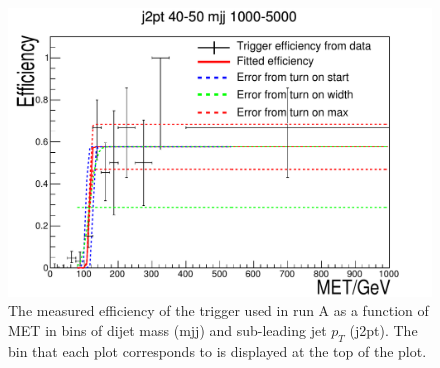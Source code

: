 \begin{figure}[h!]
\begin{center}
    \includegraphics[width=.6\largefigwidth]{plots/parked/trigfitplots/hData_MET_1D_25A.pdf}
    \caption{The measured efficiency of the trigger used in run A as a function of MET in bins of dijet mass (mjj) and sub-leading jet $p_{T}$ (j2pt). The bin that each plot corresponds to is displayed at the top of the plot.}
    \label{fig:trigfitplotsA1}
  \end{center}
\end{figure}

